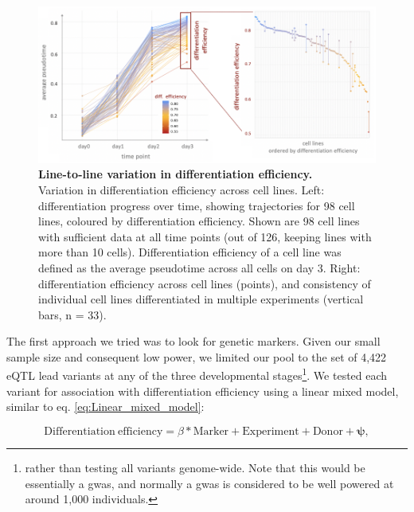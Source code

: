 \begin{figure}[h]
\centering
\includegraphics[width=15.5cm]{Chapter4/Fig/endodiff_differentiation_efficiency.png}
\caption[Line-to-line variation in differentiation efficiency]{\textbf{Line-to-line variation in differentiation efficiency.}\\
Variation in differentiation efficiency across cell lines. 
Left: differentiation progress over time, showing trajectories for 98 cell lines, coloured by differentiation efficiency. 
Shown are 98 cell lines with sufficient data at all time points (out of 126, keeping lines with more than 10 cells). 
Differentiation efficiency of a cell line was defined as the average pseudotime across all cells on day 3.
Right: differentiation efficiency across cell lines (points), and consistency of individual cell lines differentiated in multiple experiments (vertical bars, n = 33).}
\label{fig:endodiff_differentiation_efficiency}
\end{figure}

The first approach we tried was to look for genetic markers.
Given our small sample size and consequent low power, we limited our pool to the set of 4,422 eQTL lead variants at any of the three developmental stages\footnote{rather than testing all variants genome-wide. Note that this would be essentially a \gls{gwas}, and normally a \gls{gwas} is considered to be well powered at around 1,000 individuals.}.
We tested each variant for association with differentiation efficiency using a linear mixed model, similar to eq. \eqref{eq:Linear_mixed_model}:

\begin{equation}\label{eq:LMM_differentiation_efficiency_prediction}
    \mathrm{Differentiation} \ \mathrm{efficiency} = \beta*\mathrm{Marker} + \mathrm{Experiment} + \mathrm{Donor} + \boldsymbol{\psi},
\end{equation}

